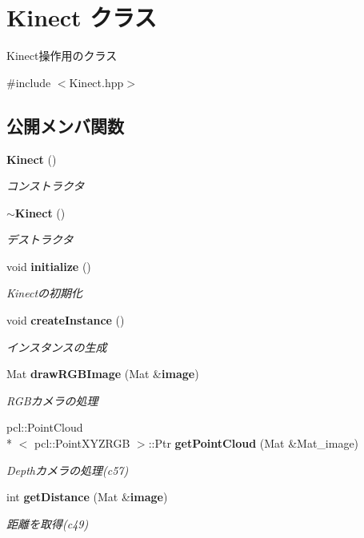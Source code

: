 \section{Kinect クラス}
\label{class_kinect}


Kinect操作用のクラス  




{\ttfamily \#include $<$Kinect.\-hpp$>$}

\subsection*{公開メンバ関数}
\begin{DoxyCompactItemize}
\item 
{\bf Kinect} ()
\begin{DoxyCompactList}\small\item\em コンストラクタ \end{DoxyCompactList}\item 
{\bf $\sim$\-Kinect} ()
\begin{DoxyCompactList}\small\item\em デストラクタ \end{DoxyCompactList}\item 
void {\bf initialize} ()
\begin{DoxyCompactList}\small\item\em Kinectの初期化 \end{DoxyCompactList}\item 
void {\bf create\-Instance} ()
\begin{DoxyCompactList}\small\item\em インスタンスの生成 \end{DoxyCompactList}\item 
Mat {\bf draw\-R\-G\-B\-Image} (Mat \&{\bf image})
\begin{DoxyCompactList}\small\item\em R\-G\-Bカメラの処理 \end{DoxyCompactList}\item 
pcl\-::\-Point\-Cloud\\*
$<$ pcl\-::\-Point\-X\-Y\-Z\-R\-G\-B $>$\-::Ptr {\bf get\-Point\-Cloud} (Mat \&Mat\-\_\-image)
\begin{DoxyCompactList}\small\item\em Depthカメラの処理(c57) \end{DoxyCompactList}\item 
int {\bf get\-Distance} (Mat \&{\bf image})
\begin{DoxyCompactList}\small\item\em 距離を取得(c49) \end{DoxyCompactList}\end{DoxyCompactItemize}
